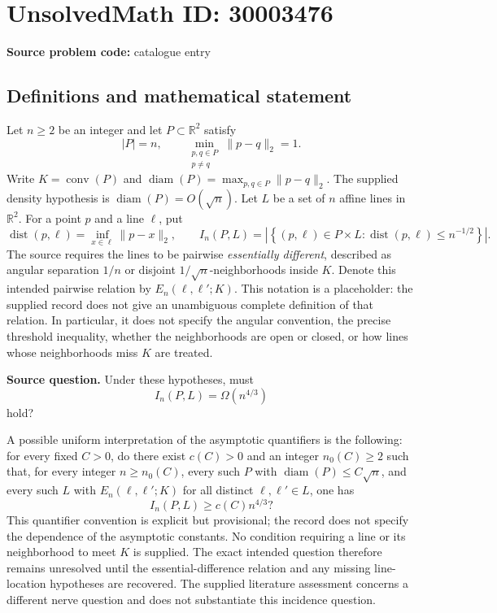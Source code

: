 \documentclass[11pt]{article}
\newcommand{\R}{\mathbb{R}}
\begin{document}
\section*{UnsolvedMath ID: 30003476}
\textbf{Source problem code:} catalogue entry
\subsection{Definitions and mathematical statement}
Let \(n\geq 2\) be an integer and let \(P\subset\R^2\) satisfy
\[
|P|=n,\qquad \min_{\substack{p,q\in P\\p\neq q}}\|p-q\|_2=1.
\]
Write \(K=\operatorname{conv}(P)\) and \(\operatorname{diam}(P)=\max_{p,q\in P}\|p-q\|_2\). The supplied density hypothesis is \(\operatorname{diam}(P)=O(\sqrt n)\). Let \(L\) be a set of \(n\) affine lines in \(\R^2\). For a point \(p\) and a line \(\ell\), put
\[
\operatorname{dist}(p,\ell)=\inf_{x\in\ell}\|p-x\|_2,
\qquad
I_n(P,L)=\left|\left\{(p,\ell)\in P\times L:\operatorname{dist}(p,\ell)\leq n^{-1/2}\right\}\right|.
\]
The source requires the lines to be pairwise \emph{essentially different}, described as angular separation \(1/n\) or disjoint \(1/\sqrt n\)-neighborhoods inside \(K\). Denote this intended pairwise relation by \(E_n(\ell,\ell';K)\). This notation is a placeholder: the supplied record does not give an unambiguous complete definition of that relation. In particular, it does not specify the angular convention, the precise threshold inequality, whether the neighborhoods are open or closed, or how lines whose neighborhoods miss \(K\) are treated.

\textbf{Source question.} Under these hypotheses, must
\[
I_n(P,L)=\Omega(n^{4/3})
\]
hold?

A possible uniform interpretation of the asymptotic quantifiers is the following: for every fixed \(C>0\), do there exist \(c(C)>0\) and an integer \(n_0(C)\geq2\) such that, for every integer \(n\geq n_0(C)\), every such \(P\) with \(\operatorname{diam}(P)\leq C\sqrt n\), and every such \(L\) with \(E_n(\ell,\ell';K)\) for all distinct \(\ell,\ell'\in L\), one has
\[
I_n(P,L)\geq c(C)n^{4/3}?
\]
This quantifier convention is explicit but provisional; the record does not specify the dependence of the asymptotic constants. No condition requiring a line or its neighborhood to meet \(K\) is supplied. The exact intended question therefore remains unresolved until the essential-difference relation and any missing line-location hypotheses are recovered. The supplied literature assessment concerns a different nerve question and does not substantiate this incidence question.
\end{document}
